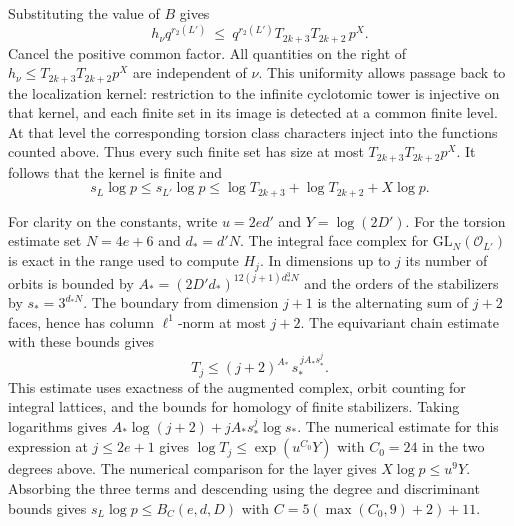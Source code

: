 Substituting the value of $B$ gives
\[
 h_\nu q^{r_2(L')}
 \ \le\ q^{r_2(L')}T_{2k+3}T_{2k+2}\,p^X.
\]
Cancel the positive common factor. All quantities on the right of
$h_\nu\le T_{2k+3}T_{2k+2}p^X$ are independent of $\nu$.
This uniformity allows passage back to the localization kernel:
restriction to the infinite cyclotomic tower is injective on that kernel,
and each finite set in its image is detected at a common finite level.
At that level the corresponding torsion class characters inject into
the functions counted above. Thus every such finite set has size at most
$T_{2k+3}T_{2k+2}p^X$. It follows that the kernel is finite and
\[
 s_L\log p\le s_{L'}\log p
 \le\log T_{2k+3}+\log T_{2k+2}+X\log p.
\]

For clarity on the constants, write $u=2ed'$ and $Y=\log(2D')$.
For the torsion estimate set $N=4e+6$ and $d_* = d'N$.
The integral face complex for $\mathrm{GL}_N(\mathcal O_{L'})$ is
exact in the range used to compute $H_j$. In dimensions up to $j$
its number of orbits is bounded by
$A_*=(2D'd_*)^{12(j+1)d_*^3N}$ and the orders of the stabilizers by
$s_*=3^{d_*N}$. The boundary from dimension $j+1$ is the alternating
sum of $j+2$ faces, hence has column $\ell^1$-norm at most $j+2$.
The equivariant chain estimate with these bounds gives
\[
 T_j\le (j+2)^{A_*}\,s_*^{\,jA_*s_*^j}.
\]
This estimate uses exactness of the augmented complex, orbit counting
for integral lattices, and the bounds for homology of finite stabilizers.
Taking logarithms gives
$A_*\log(j+2)+jA_*s_*^j\log s_*$. The numerical estimate for this
expression at $j\le2e+1$ gives
$\log T_j\le \exp(u^{C_0}Y)$ with $C_0=24$ in the two degrees above. The numerical
comparison for the layer gives $X\log p\le u^9Y$. Absorbing the three
terms and descending using the degree and discriminant bounds gives
$s_L\log p\le B_C(e,d,D)$ with $C=5(\max(C_0,9)+2)+11$.

